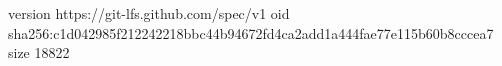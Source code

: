 version https://git-lfs.github.com/spec/v1
oid sha256:c1d042985f212242218bbc44b94672fd4ca2add1a444fae77e115b60b8cccea7
size 18822
